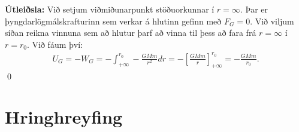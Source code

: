 \textbf{Útleiðsla:} Við setjum viðmiðunarpunkt stöðuorkunnar í $r = \infty$. Þar er þyngdarlögmálskrafturinn sem verkar á hlutinn gefinn með $F_G = 0$. Við viljum síðan reikna vinnuna sem að hlutur þarf að vinna til þess að fara frá $r = \infty$ í $r = r_0$. Við fáum því:
\begin{align*}
    U_G = -W_G = - \int_{+\infty}^{r_0} -\frac{GMm}{r^2} dr = -\left[  \frac{GMm}{r} \right]_{+\infty}^{r_0} = -\frac{GMm}{r_0}.
\end{align*}
\qed

\section{Hringhreyfing}

